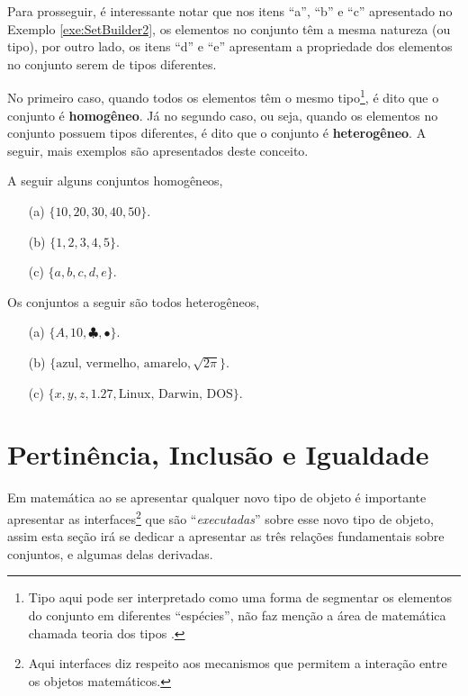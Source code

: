 Para prosseguir, é interessante notar que nos itens ``a'', ``b'' e ``c'' apresentado no Exemplo \ref{exe:SetBuilder2}, os elementos no conjunto têm a mesma natureza (ou tipo), por outro lado, os itens ``d'' e ``e'' apresentam a propriedade dos elementos no conjunto serem de tipos diferentes. 

No primeiro caso, quando todos os elementos têm o mesmo tipo\footnote{Tipo aqui pode ser interpretado como uma forma de segmentar os elementos do conjunto em diferentes ``espécies'', não faz menção a área de matemática chamada teoria dos tipos \cite{nederpelt2014}.}, é dito que o conjunto é \textbf{homogêneo}. Já no segundo caso, ou seja, quando os elementos no conjunto possuem tipos diferentes, é dito que o conjunto é \textbf{heterogêneo}. A seguir, mais exemplos são apresentados deste conceito.

\begin{exemplo}\label{exe:ConjuntoHomogeneo1}
  A seguir alguns conjuntos homogêneos, 
  \begin{itemize}
    \item[(a)] $\{10, 20, 30, 40, 50\}$.
    \item[(b)] $\{1, 2, 3, 4, 5\}$.
    \item[(c)] $\{a, b, c, d, e\}$.
  \end{itemize}
\end{exemplo}

\begin{exemplo}\label{exe¨ConjuntoHeterogeneo1}
  Os conjuntos a seguir são todos heterogêneos,
  \begin{itemize}
    \item[(a)] $\{A, 10, \clubsuit, \bullet\}$.
    \item[(b)] $\{\text{azul, vermelho, amarelo}, \sqrt{2\pi}\}$.
    \item[(c)] $\{x, y, z, 1.27, \text{Linux, Darwin, DOS}\}$.
  \end{itemize}
\end{exemplo}

\section{Pertinência, Inclusão e Igualdade}\label{sec:RelacoesFundamentais}

Em matemática ao se apresentar qualquer novo tipo de objeto é importante apresentar as interfaces\footnote{Aqui interfaces diz respeito aos mecanismos que permitem a interação entre os objetos matemáticos.} que são ``\textit{executadas}'' sobre esse novo tipo de objeto, assim esta seção irá se dedicar a apresentar as três relações fundamentais sobre conjuntos, e algumas delas derivadas. 

